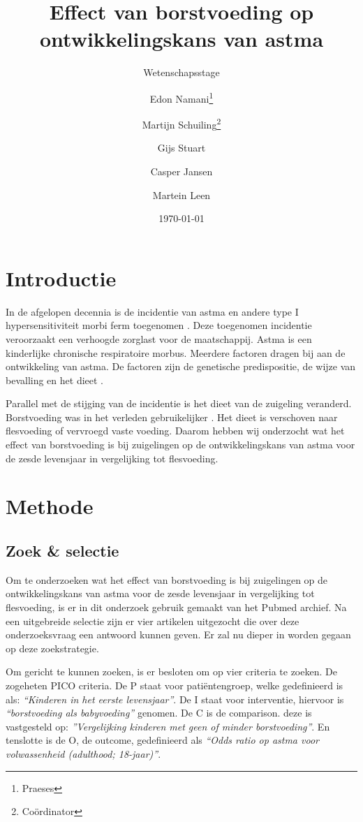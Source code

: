 \documentclass[abstract=true]{scrartcl}
\title{Effect van borstvoeding op ontwikkelingskans van astma}
\subtitle{Wetenschapsstage}
\author{Edon Namani\thanks{Praeses} \and Martijn Schuiling\thanks{Co\"ordinator} \and Gijs Stuart \and Casper Jansen \and Martein Leen}
\date{\today}
\begin{document}
\maketitle
    \begin{abstract}

    \end{abstract}

\section{Introductie}
In de afgelopen decennia is de incidentie van astma en andere type I hypersensitiviteit morbi ferm toegenomen \cite{Platts_Mills_2015}. Deze toegenomen incidentie veroorzaakt een verhoogde zorglast voor de maatschappij. Astma is een kinderlijke chronische respiratoire morbus. Meerdere factoren dragen bij aan de ontwikkeling van astma. De factoren zijn de genetische predispositie, de wijze van bevalling en het dieet \cite{abbas2017cellular,Houghteling_2015}.

Parallel met de stijging van de incidentie is het dieet van de zuigeling veranderd. Borstvoeding was in het verleden gebruikelijker \cite{world1981contemporary,Victora_2016,Rollins_2016}. Het dieet is verschoven naar flesvoeding of vervroegd vaste voeding. Daarom hebben wij onderzocht wat het effect van borstvoeding is bij zuigelingen op de ontwikkelingskans van astma voor de zesde levensjaar in vergelijking tot flesvoeding.


\section{Methode}
    \subsection{Zoek \& selectie}
    Om te onderzoeken wat het effect van borstvoeding is bij zuigelingen op de ontwikkelingskans van astma voor de zesde levensjaar in vergelijking tot flesvoeding, is er in dit onderzoek gebruik gemaakt van het Pubmed archief. Na een uitgebreide selectie zijn er vier artikelen uitgezocht die over deze onderzoeksvraag een antwoord kunnen geven. 
    Er zal nu dieper in worden gegaan op deze zoekstrategie.

Om gericht te kunnen zoeken, is er besloten om op vier criteria te zoeken. De zogeheten PICO criteria. De P staat voor patiëntengroep, welke gedefinieerd is als: \textit{“Kinderen in het eerste levensjaar”}. De I staat voor interventie, hiervoor is \textit{“borstvoeding als babyvoeding”} genomen. De C is de comparison. deze is vastgesteld op: \textit{”Vergelijking kinderen met geen of minder borstvoeding”}. En tenslotte is de O, de outcome, gedefinieerd als \textit{“Odds ratio op astma voor volwassenheid (adulthood; 18-jaar)”}.
\end{document}
